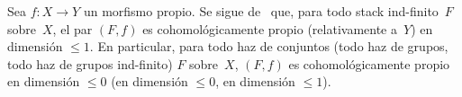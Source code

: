 \setcounter{proposition}{3}%
\begin{exemple}
\label{XIII.1.4}
Sea $f \colon X \to Y$ un morfismo propio. Se sigue de~\cite[VII
2.2.2]{XIII.2} que, para todo stack ind-finito~$F$ sobre~$X$, el par
$(F,f)$ es cohomológicamente propio (relativamente a~$Y$) en dimensión
$\leqslant 1$. En particular, para todo haz de conjuntos (\resp todo haz de
grupos, \resp todo haz de grupos ind-finito) $F$ sobre~$X$, $(F,f)$ es
cohomológicamente
propio en dimensión $\leqslant 0$ (\resp en dimensión $\leqslant 0$,
\resp en dimensión $\leqslant 1$).
\end{exemple}
